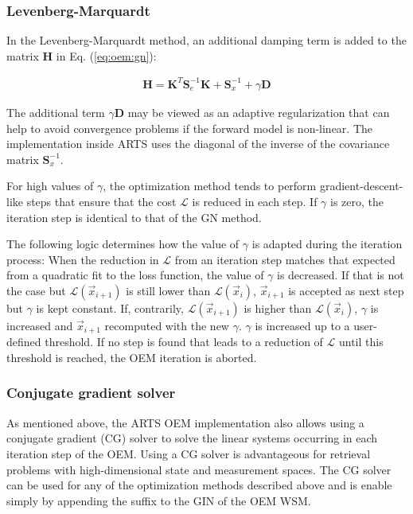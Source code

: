 \subsubsection{Levenberg-Marquardt}
In the Levenberg-Marquardt method, an additional damping term is added to the
matrix $\mathbf{H}$ in Eq. (\ref{eq:oem:gn}):


\begin{eqnarray}
\mathbf{H} = \mathbf{K}^T\mathbf{S}_e^{-1}\mathbf{K} + \mathbf{S}_x^{-1} +\gamma\mathbf{D}
\end{eqnarray}

The additional term $\gamma \mathbf{D}$ may be viewed as an adaptive regularization that
can help to avoid convergence problems if  the forward model is non-linear. The
 implementation
inside ARTS uses the diagonal of the inverse of the covariance matrix $\mathbf{S}_x^{-1}$.

For high values of $\gamma$, the optimization method tends to perform 
 gradient-descent-like steps that ensure that the cost $\mathcal{L}$
is reduced in each step. If $\gamma$ is zero, the iteration step is identical
to that of the GN method.

The following logic determines how the value of $\gamma$ is adapted during
the iteration process: When the reduction in $\mathcal{L}$ from an iteration
 step matches that expected from a quadratic fit to the loss function, the
 value of $\gamma$ is decreased.  If that is not the
 case but $\mathcal{L}(\vec{x}_{i + 1})$ is still  lower than
 $\mathcal{L}(\vec{x}_i)$, $\vec{x}_{i+1}$ is accepted
as next step but $\gamma$ is kept constant. If, contrarily, 
$\mathcal{L}(\vec{x}_{i+1})$ is higher than  $\mathcal{L}(\vec{x}_i)$,
 $\gamma$ is increased and $\vec{x}_{i+1}$  recomputed with the new $\gamma$.
$\gamma$ is increased up to a user-defined threshold. If no step is found
 that leads to a reduction of $\mathcal{L}$ until this threshold is reached,
the OEM iteration is aborted.


\subsubsection{Conjugate gradient solver}
\label{sec:oem:cg}
As mentioned above, the ARTS OEM implementation also allows using a conjugate
gradient (CG) solver to solve the linear systems occurring in each iteration
 step of the OEM. Using a CG solver is advantageous for retrieval problems
 with high-dimensional state and measurement spaces. The CG solver can be used
 for any of the optimization methods described above and is enable simply
 by appending the  suffix to the  GIN of
 the OEM WSM.

